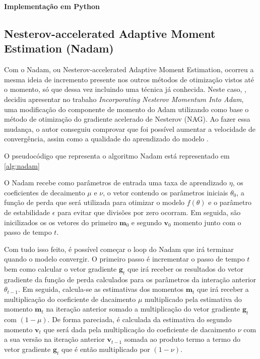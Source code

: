 \textbf{Implementação em Python}

\subsection{Nesterov-accelerated Adaptive Moment Estimation (Nadam)}

Com o Nadam, ou Nesterov-accelerated Adaptive Moment Estimation, ocorreu a mesma ideia de incremento presente nos outros métodos de otimização vistos até o momento, só que dessa vez incluindo uma técnica já conhecida. Neste caso, \textcite{NadamMethod}, decidiu apresentar no trabaho \textit{Incorporating Nesterov Momentum Into Adam}, uma modificação do componente de momento do Adam utilizando como base o método de otimização do gradiente acelerado de Nesterov (NAG). Ao fazer essa mudança, o autor conseguiu comprovar que foi possível aumentar a velocidade de convergência, assim como a qualidade do aprendizado do modelo \parencite{NadamMethod}.

O pseudocódigo que representa o algoritmo Nadam está representado em \ref{alg:nadam}

O Nadam recebe como parâmetros de entrada uma taxa de aprendizado $\eta$, os coeficientes de decaimento $\mu$ e $\nu$, o vetor contendo os parâmetros iniciais $\theta_0$, a função de perda que será utilizada para otimizar o modelo $f(\theta)$ e o parâmetro de estabilidade $\epsilon$ para evitar que divisões por zero ocorram. Em seguida, são inicilizados os os vetores do primeiro $\mathbf{m}_0$ e segundo $\mathbf{v}_0$ momento junto com o passo de tempo $t$.

Com tudo isso feito, é possível começar o loop do Nadam que irá terminar quando o modelo convergir. O primeiro passo é incrementar o passo de tempo $t$ bem como calcular o vetor gradiente $\mathbf{g}_t$ que irá receber os resultados do vetor gradiente da função de perda calculados para os parâmetros da interação anterior $\theta_{t-1}$. Em seguida, calcula-se as estimativas dos momentos $\mathbf{m}_t$ que irá receber a multiplicação do coeficiente de dacaimento $\mu$ multiplicado pela estimativa do momento $\mathbf{m}_t$ na iteração anterior somado a multiplicação do vetor gradiente $\mathbf{g}_t$ com $(1 - \mu)$. De forma pareciada, é calculada da estimativa do segundo momento $\mathbf{v}_t$ que será dada pela multiplicação do coeficiente de dacaimento $\nu$ com a sua versão na iteração anterior $\mathbf{v}_{t-1}$ somada ao produto termo a termo do vetor gradiente $\mathbf{g}_t$ que é então multiplicado por $(1 - \nu)$.

